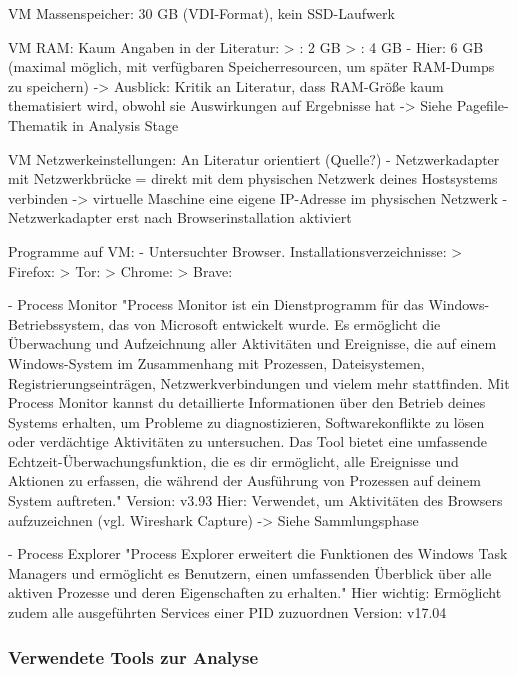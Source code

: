 VM Massenspeicher: 30 GB (VDI-Format), kein SSD-Laufwerk

VM RAM: Kaum Angaben in der Literatur:
	> \cite{Rochmadi.2017}: 2 GB 
	> \cite{Ohana.2013}: 4 GB
	- Hier: 6 GB (maximal möglich, mit verfügbaren Speicherresourcen, um später RAM-Dumps zu speichern)
	-> Ausblick: Kritik an Literatur, dass RAM-Größe kaum thematisiert wird, obwohl sie Auswirkungen auf Ergebnisse hat -> Siehe Pagefile-Thematik in Analysis Stage

VM Netzwerkeinstellungen: An Literatur orientiert (Quelle?)
	- Netzwerkadapter mit Netzwerkbrücke = direkt mit dem physischen Netzwerk deines Hostsystems verbinden -> virtuelle Maschine eine eigene IP-Adresse im physischen Netzwerk
	- Netzwerkadapter erst nach Browserinstallation aktiviert

Programme auf VM:
	- Untersuchter Browser. Installationsverzeichnisse:
		> Firefox: %
		> Tor: %
		> Chrome:
		> Brave:
			
	- Process Monitor
		"Process Monitor ist ein Dienstprogramm für das Windows-Betriebssystem, das von Microsoft entwickelt wurde. Es ermöglicht die Überwachung und Aufzeichnung aller Aktivitäten und Ereignisse, die auf einem Windows-System im Zusammenhang mit Prozessen, Dateisystemen, Registrierungseinträgen, Netzwerkverbindungen und vielem mehr stattfinden. Mit Process Monitor kannst du detaillierte Informationen über den Betrieb deines Systems erhalten, um Probleme zu diagnostizieren, Softwarekonflikte zu lösen oder verdächtige Aktivitäten zu untersuchen. Das Tool bietet eine umfassende Echtzeit-Überwachungsfunktion, die es dir ermöglicht, alle Ereignisse und Aktionen zu erfassen, die während der Ausführung von Prozessen auf deinem System auftreten."
		Version: v3.93
		Hier: Verwendet, um Aktivitäten des Browsers aufzuzeichnen (vgl. Wireshark Capture) -> Siehe Sammlungsphase
	
	- Process Explorer
		"Process Explorer erweitert die Funktionen des Windows Task Managers und ermöglicht es Benutzern, einen umfassenden Überblick über alle aktiven Prozesse und deren Eigenschaften zu erhalten." 
		Hier wichtig: Ermöglicht zudem alle ausgeführten Services einer PID zuzuordnen
		Version: v17.04

\subsubsection*{Verwendete Tools zur Analyse}


